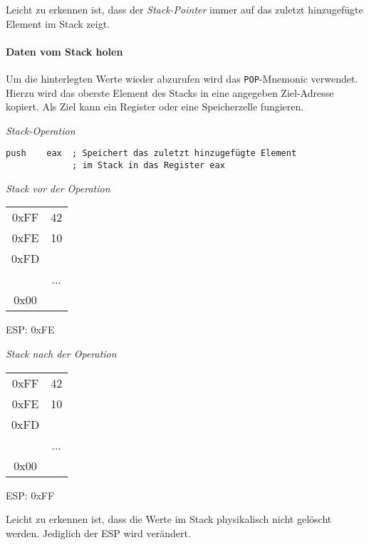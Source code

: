 Leicht zu erkennen ist, dass der \textit{Stack-Pointer} immer auf das zuletzt hinzugefügte Element im Stack zeigt.


\paragraph{Daten vom Stack holen\newline}
Um die hinterlegten Werte wieder abzurufen wird das \texttt{POP}-Mnemonic verwendet.
Hierzu wird das oberste Element des Stacks in eine angegeben Ziel-Adresse kopiert. Als Ziel kann ein Register oder eine Speicherzelle fungieren.  

\textit{Stack-Operation}
\begin{lstlisting}
push    eax  ; Speichert das zuletzt hinzugefügte Element
             ; im Stack in das Register eax
\end{lstlisting}

\begin{multicols}{2}

\begin{minipage}{5cm}
\emph{Stack vor der Operation}
\begin{tabular}{c|c|}
	\cline{2-2}
   0xFF & 42\\ \cline{2-2}
   0xFE & 10\\ \cline{2-2}
   0xFD & \\ \cline{2-2}
	      & ... \\ \cline{2-2}
	 0x00 & \\ \cline{2-2}
\end{tabular}
ESP: 0xFE
\end{minipage}

\begin{minipage}{5cm}
\emph{Stack nach der Operation}
\begin{tabular}{c|c|}
	\cline{2-2}
   0xFF & 42\\ \cline{2-2}
   0xFE & 10\\ \cline{2-2}
   0xFD & \\ \cline{2-2}
	      & ... \\ \cline{2-2}
	 0x00 & \\ \cline{2-2}
\end{tabular}
ESP: 0xFF
\end{minipage}
\end{multicols}

Leicht zu erkennen ist, dass die Werte im Stack physikalisch nicht gelöscht werden. Jediglich der ESP  wird verändert.

